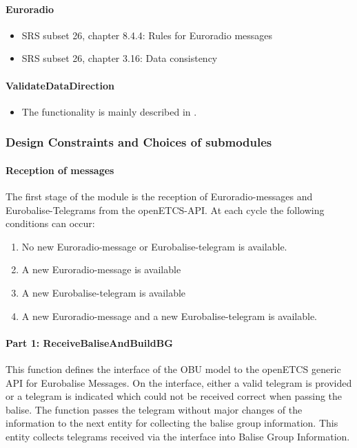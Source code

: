 \documentclass{template/openetcs_report}
\begin{document}
\paragraph{Euroradio}
\begin{itemize}
 \item SRS subset 26, chapter 8.4.4: Rules for Euroradio messages
 \item SRS subset 26, chapter 3.16: Data consistency
\end{itemize}

\paragraph{ValidateDataDirection}
\begin{itemize}
 \item The functionality is mainly described in \cite[Chapter~3.6.3]{subset-026}.
\end{itemize}

\subsubsection{Design Constraints and Choices of submodules}

\paragraph{Reception of messages}

The first stage of the module is the reception of Euroradio-messages and Eurobalise-Telegrams from the openETCS-API. At each cycle the following conditions can occur:
\begin{enumerate}
 \item No new Euroradio-message or Eurobalise-telegram is available.
 \item A new Euroradio-message is available
 \item A new Eurobalise-telegram is available
 \item A new Euroradio-message and a new Eurobalise-telegram is available.
\end{enumerate}

\paragraph{Part 1: ReceiveBaliseAndBuildBG}\label{ss:ReceiveEurobaliseFromAPI}

This function defines the interface of the OBU model to the openETCS generic API for Eurobalise Messages. On the interface, either a valid telegram is provided or a telegram is indicated which could not be received correct when passing the balise. The function passes the telegram without major changes of the information to the next entity for collecting the balise group information. This entity collects telegrams received via the interface into Balise Group Information.
	
\end{document}
